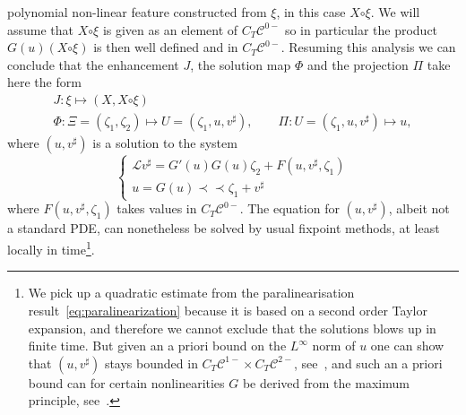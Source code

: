 \documentclass[a4paper, 11pt]{article}
\newcommand{\CC}{\mathcal{C}}
\newcommand{\LL}{\mathcal{L}}
\newcommand{\mpara}{\mathord{\prec\!\!\!\prec}}
\newcommand{\reso}{\mathord{\circ}}
\begin{document}
polynomial non-linear feature constructed from $\xi$, in this case $X \reso
\xi$. We will assume that $X \reso \xi$ is given as an element of $C_T
\mathcal{C}^{0 -}$ so in particular the product $G (u) (X \reso \xi)$ is then
well defined and in $C_T \mathcal{C}^{0 -}$. Resuming this analysis we can
conclude that the enhancement $J$, the solution map $\Phi$ and the projection
$\Pi$ take here the form
\begin{equation}
  \begin{array}{l}
    J : \xi \mapsto (X, X \reso \xi)\\
    \Phi : \Xi = (\zeta_1, \zeta_2) \mapsto U = (\zeta_1, u, v^{\sharp}),
    \qquad \Pi : U = (\zeta_1, u, v^{\sharp}) \mapsto u,
  \end{array} \label{eq:gPAM-sol}
\end{equation}
where $(u, v^{\sharp})$ is a solution to the system
\[ \left\{ \begin{array}{l}
     \LL v^{\sharp} = G' (u) G (u) \zeta_2 + F (u, v^{\sharp}, \zeta_1)\\
     u = G (u) \mpara \zeta_1 + v^{\sharp}
   \end{array} \right. \]
where $F (u, v^{\sharp}, \zeta_1)$ takes values in $C_T \mathcal{C}^{0 -}$.
The equation for $ (u, v^{\sharp})$, albeit not a standard PDE, can
nonetheless be solved by usual fixpoint methods, at least locally in time\footnote{
We pick up a quadratic estimate from the paralinearisation result~\eqref{eq:paralinearization} because it is based on a second order Taylor expansion, and therefore we cannot exclude that the solutions blows up in finite time. But given an a priori bound on the $L^\infty$ norm of $u$ one can show that $(u,v^\sharp)$ stays bounded in $C_T\CC^{1-} \times C_T \CC^{2-}$, see~\cite{gubinelli_paracontrolled_2015}, and such an a priori bound can for certain nonlinearities $G$ be derived from the maximum principle, see~\cite{cannizzaro_malliavin_2017}.}.
\end{document}
